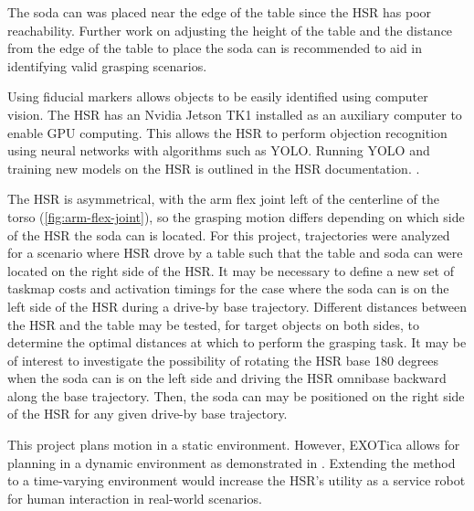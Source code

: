 \documentclass[11pt]{article}
\begin{document}
        \par The soda can was placed near the edge of the table since the HSR has poor reachability. Further work on adjusting the height of the table and the distance from the edge of the table to place the soda can is recommended to aid in identifying valid grasping scenarios.

        \par Using fiducial markers allows objects to be easily identified using computer vision. The HSR has an Nvidia Jetson TK1 installed as an auxiliary computer to enable GPU computing. This allows the HSR to perform objection recognition using neural networks with algorithms such as YOLO. Running YOLO and training new models on the HSR is outlined in the HSR documentation. \cite{noauthor_hsrb_manual_nodate}.

        \par The HSR is asymmetrical, with the arm flex joint left of the centerline of the torso (\cref{fig:arm-flex-joint}), so the grasping motion differs depending on which side of the HSR the soda can is located. For this project, trajectories were analyzed for a scenario where HSR drove by a table such that the table and soda can were located on the right side of the HSR. It may be necessary to define a new set of taskmap costs and activation timings for the case where the soda can is on the left side of the HSR during a drive-by base trajectory. Different distances between the HSR and the table may be tested, for target objects on both sides, to determine the optimal distances at which to perform the grasping task. It may be of interest to investigate the possibility of rotating the HSR base 180 degrees when the soda can is on the left side and driving the HSR omnibase backward along the base trajectory. Then, the soda can may be positioned on the right side of the HSR for any given drive-by base trajectory.

        \par This project plans motion in a static environment. However, EXOTica allows for planning in a dynamic environment as demonstrated in \cite{yang_planning_2018}. Extending the method to a time-varying environment would increase the HSR's utility as a service robot for human interaction in real-world scenarios.
\end{document}
